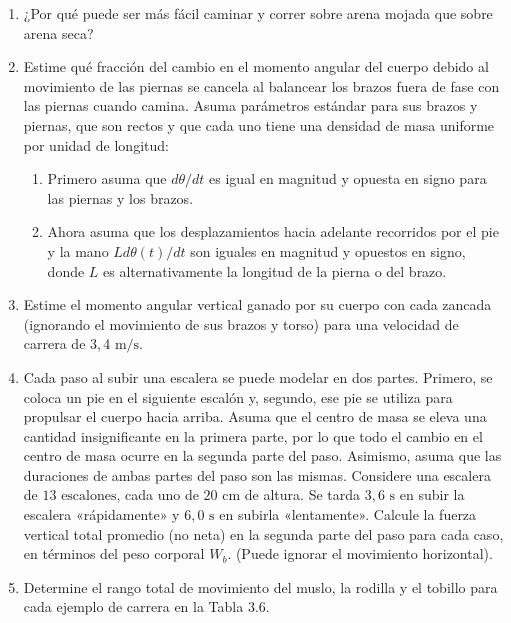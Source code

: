 \documentclass[12pt]{book}
\begin{document}
\begin{enumerate}
\item[3.29] ¿Por qué puede ser más fácil caminar y correr sobre arena mojada que sobre arena seca?

\item[3.30] Estime qué fracción del cambio en el momento angular del cuerpo debido al movimiento de las piernas se cancela al balancear los brazos fuera de fase con las piernas cuando camina. Asuma parámetros estándar para sus brazos y piernas, que son rectos y que cada uno tiene una densidad de masa uniforme por unidad de longitud:
\begin{enumerate}
\item[(a)] Primero asuma que $d\theta/dt$ es igual en magnitud y opuesta en signo para las piernas y los brazos.
\item[(b)] Ahora asuma que los desplazamientos hacia adelante recorridos por el pie y la mano $L d\theta(t)/dt$ son iguales en magnitud y opuestos en signo, donde $L$ es alternativamente la longitud de la pierna o del brazo.
\end{enumerate}

\item[3.31] Estime el momento angular vertical ganado por su cuerpo con cada zancada (ignorando el movimiento de sus brazos y torso) para una velocidad de carrera de $3{,}4\text{ m/s}$.

\item[3.32] Cada paso al subir una escalera se puede modelar en dos partes. Primero, se coloca un pie en el siguiente escalón y, segundo, ese pie se utiliza para propulsar el cuerpo hacia arriba. Asuma que el centro de masa se eleva una cantidad insignificante en la primera parte, por lo que todo el cambio en el centro de masa ocurre en la segunda parte del paso. Asimismo, asuma que las duraciones de ambas partes del paso son las mismas. Considere una escalera de $13\text{ escalones}$, cada uno de $20\text{ cm}$ de altura. Se tarda $3{,}6\text{ s}$ en subir la escalera «rápidamente» y $6{,}0\text{ s}$ en subirla «lentamente». Calcule la fuerza vertical total promedio (no neta) en la segunda parte del paso para cada caso, en términos del peso corporal $W_b$. (Puede ignorar el movimiento horizontal).

\item[3.33] Determine el rango total de movimiento del muslo, la rodilla y el tobillo para cada ejemplo de carrera en la Tabla 3.6.


\end{enumerate}
\end{document}
